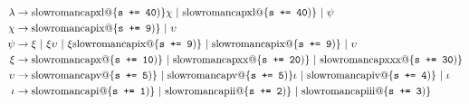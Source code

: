 \documentclass[a4paper,10pt]{scrartcl}
\makeatletter
\newcommand{\Rm}[1]{\textrm{\expandafter\@slowromancap\romannumeral #1@}}
\newcommand{\add}[1]{\{\texttt{s += #1})\}}
\makeatother
\begin{document}
\begin{enumerate}
\begin{align*}
        \lambda &\to \Rm{40}\add{40}\chi\ |\ \Rm{40}\add{40}\ |\ \psi \\
        \chi    &\to \Rm{9}\add{9}\ |\ \upsilon \\
        \psi    &\to \xi\ |\ \xi\upsilon\ |\ \xi \Rm{9}\add{9}\ |\ \Rm{9}\add{9}\ |\ \upsilon \\
        \xi     &\to \Rm{10}\add{10}\ |\ \Rm{20}\add{20}\ |\ \Rm{30}\add{30} \\
        \upsilon &\to \Rm{5}\add{5}\ |\ \Rm{5}\add{5}\iota\ |\ \Rm{4}\add{4}\ |\ \iota \\
        \iota   &\to \Rm{1}\add{1}\ |\ \Rm{2}\add{2}\ |\ \Rm{3}\add{3}
        \end{align*}
\end{enumerate}
\end{document}
